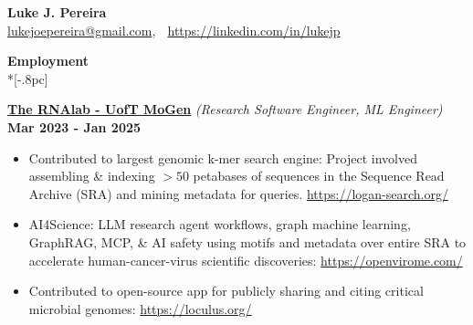 \documentclass{article}
\begin{document}
\begin{center}
{\Large \bf Luke J. Pereira} \\[.5pc]
\href{mailto:lukejoepereira@gmail.com}{lukejoepereira@gmail.com}, $\;$
\href{https://linkedin.com/in/lukejp}{https://linkedin.com/in/lukejp}
\\[3pc]
\end{center}
\vspace{-25pt}

{\large \bf Employment} \\*[-.8pc]
\underline{\hspace{7in}}

{\bf{\underline{The RNAlab - UofT MoGen}} } \textit{(Research Software Engineer, ML Engineer)} \hfill {\bf Mar 2023 - Jan 2025\/} 
\begin{itemize}[leftmargin=*]
    \itemsep0em
    \renewcommand\labelitemi{\tiny$\bullet$}
    \item Contributed to largest genomic k-mer search engine: Project involved assembling \& indexing $>50$ petabases of sequences in the Sequence Read Archive (SRA) and mining metadata for queries. \url{https://logan-search.org/}
    \item AI4Science: LLM research agent workflows, graph machine learning, GraphRAG, MCP, \& AI safety using motifs and metadata over entire SRA to accelerate human-cancer-virus scientific discoveries: \url{https://openvirome.com/}
    \item Contributed to open-source app for publicly sharing and citing critical microbial genomes: \url{https://loculus.org/}
\end{itemize}
\end{document}
